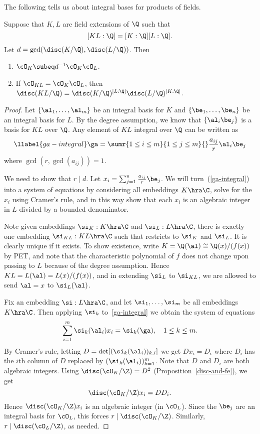 The following tells us about integral bases for products of fields. 
\begin{pr}
Suppose that $K,L$ are field extensions of $\Q$ such that
\[
[KL:\Q]=[K:\Q][L:\Q].
\]
Let $d=\gcd(\disc(K/\Q),\disc(L/\Q))$. 
Then 
\begin{enumerate}
\item $\cO_K\subeq d^{-1}\cO_K\cO_L$.
\item If $\cO_{KL}=\cO_K\cO_L$, then $\disc(KL/\Q)=\disc(K/\Q)^{[L:\Q]}\disc(L/\Q)^{[K:\Q]}$.
\end{enumerate}
\end{pr}
\begin{proof}
Let $\{\al_1,\ldots, \al_m\}$ be an integral basis for $K$ and $\{\be_1,\ldots, \be_n\}$ be an integral basis for $L$. By the degree assumption, we know that $\{\al_i\be_j\}$ is a basis for $KL$ over $\Q$. Any element of $KL$ integral over $\Q$ can be written as
\begin{equation}\llabel{ga-integral}
\ga=\sumr{1\le i\le m}{1\le j\le m}{} \frac{a_{ij}}{r}\al_i\be_j
\end{equation}
where $\gcd(r,\gcd(a_{ij}))=1$. 

We need to show that $r\mid d$. Let $x_i=\sum_{j=1}^n \frac{a_{ij}}{r}\be_j$. We will turn~(\ref{ga-integral}) into a system of equations by considering all embeddings $K\hra \C$, solve for the $x_i$ using Cramer's rule, and in this way show that each $x_i$ is an algebraic integer in $L$ divided by a bounded denominator.

Note given embeddings $\si_K:K\hra \C$ and $\si_L:L\hra \C$, there is exactly one embedding $\si_{KL}:KL\hra \C$ such that restricts to $\si_K$ and $\si_L$. It is clearly unique if it exists. To show existence, write $K=\Q(\al)\cong\Q(x)/(f(x))$ by PET, and note that the characteristic polynomial of $f$ does not change upon passing to $L$ because of the degree assumption. Hence $KL=L(\al)=L(x)/(f(x))$, and in extending $\si_L$ to $\si_{KL}$, we are allowed to send $\al=x$ to $\si_L(\al)$.

Fix an embedding $\si:L\hra \C$, and let $\si_1,\ldots, \si_m$ be all embeddings $K\hra \C$. Then applying $\si_k$ to~\ref{ga-integral} we obtain the system of equations
\[
\sum_{i=1}^m \si_k(\al_i) x_i =\si_k(\ga),\quad 1\le k\le m.
\]
By Cramer's rule, letting $D=\det[(\si_k(\al_i))_{k,i}]$ we get $Dx_i=D_i$ where $D_i$ has the $i$th column of $D$ replaced by $(\si_k(\al_i))_{k=1}^m$. Note that $D$ and $D_i$ are both algebraic integers.
Using $\disc(\cO_K/\Z)=D^2$ (Proposition~\ref{disc-and-fe}), we get
\[
\disc(\cO_K/\Z)x_i=DD_i.
\]
Hence $\disc(\cO_K/\Z)x_i$ is an algebraic integer (in $\cO_L$). Since the $\be_j$ are an integral basis for $\cO_L$, this forces $r\mid \disc(\cO_K/\Z)$. Similarly, $r\mid \disc(\cO_L/\Z)$, as needed.


\end{proof}
